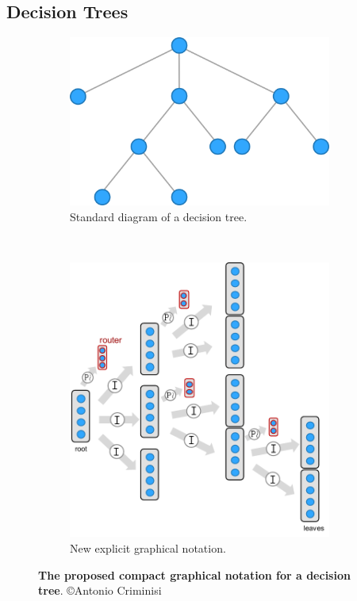 \documentclass[thesis]{subfiles}
\begin{document}
\subsection{Decision Trees}
\begin{figure}[htbp!] 
\centering
\begin{subfigure}[b]{0.45\textwidth}
   \centering
   \includegraphics[width=0.95\textwidth]{oldtreenotation}
   \caption{Standard diagram of a decision tree.}
   \label{fig:oldtreenotation}
\end{subfigure}
~
\begin{subfigure}[b]{0.45\textwidth}
   \centering
   \includegraphics[width=0.95\textwidth]{newtreenotation}
   \caption{New explicit graphical notation.}
   \label{fig:newtreenotation}
\end{subfigure}
\caption[New graphical notation for a binary decision tree.]{{\bf The proposed compact graphical notation for a decision tree}. \copyright Antonio Criminisi}
\label{fig:decisionTree}
\end{figure}
\end{document}
